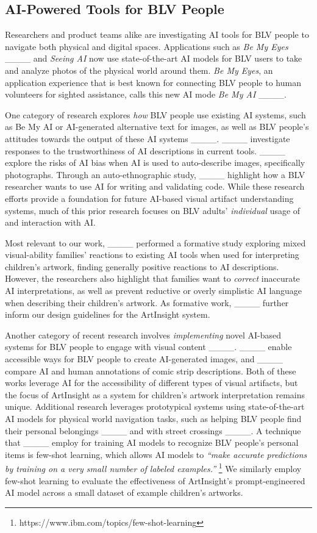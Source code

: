\subsection{AI-Powered Tools for BLV People}
Researchers and product teams alike are investigating AI tools for BLV people to navigate both physical and digital spaces. Applications such as \textit{Be My Eyes} ____ and \textit{Seeing AI} now use state-of-the-art AI models for BLV users to take and analyze photos of the physical world around them. \textit{Be My Eyes}, an application experience that is best known for connecting BLV people to human volunteers for sighted assistance, calls this new AI mode \textit{Be My AI} ____.  

One category of research explores \textit{how} BLV people use existing AI systems, such as Be My AI or AI-generated alternative text for images, as well as BLV people's attitudes towards the output of these AI systems ____. ____ investigate responses to the trustworthiness of AI descriptions in current tools. ____ explore the risks of AI bias when AI is used to auto-describe images, specifically photographs. Through an auto-ethnographic study, ____ highlight how a BLV researcher wants to use AI for writing and validating code. While these research efforts provide a foundation for future AI-based visual artifact understanding systems, much of this prior research focuses on BLV adults' \textit{individual} usage of and interaction with AI.

Most relevant to our work, ____ performed a formative study exploring mixed visual-ability families' reactions to existing AI tools when used for interpreting children's artwork, finding generally positive reactions to AI descriptions. However, the researchers also highlight that families want to \textit{correct} inaccurate AI interpretations, as well as prevent reductive or overly simplistic AI language when describing their children's artwork. As formative work, ____ further inform our design guidelines for the ArtInsight system. 

Another category of recent research involves \textit{implementing} novel AI-based systems for BLV people to engage with visual content ____. ____ enable accessible ways for BLV people to create AI-generated images, and ____ compare AI and human annotations of comic strip descriptions. Both of these works leverage AI for the accessibility of different types of visual artifacts, but the focus of ArtInsight as a system for children's artwork interpretation remains unique. Additional research leverages prototypical systems using state-of-the-art AI models for physical world navigation tasks, such as helping BLV people find their personal belongings ____ and with street crossings ____. A technique that ____ employ for training AI models to recognize BLV people's personal items is few-shot learning, which allows AI models to \textit{``make accurate predictions by training on a very small number of labeled examples.''} \footnote{https://www.ibm.com/topics/few-shot-learning} We similarly employ few-shot learning to evaluate the effectiveness of ArtInsight's prompt-engineered AI model across a small dataset of example children's artworks.

